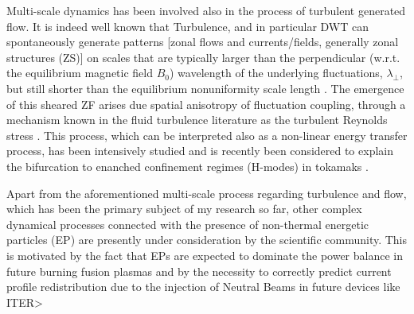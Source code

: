 \documentclass[12pt,a4paper]{article}
\begin{document}
Multi-scale dynamics has been involved also in the process of
turbulent generated flow. It is indeed well known that Turbulence, and
in particular DWT can spontaneously generate patterns [zonal flows and
currents/fields, generally zonal structures (ZS)] 
on scales that are typically larger than the perpendicular (w.r.t. the
equilibrium magnetic field $B_0$) 
wavelength of the underlying fluctuations, $\lambda_{\perp}$, but
still shorter than the equilibrium nonuniformity scale length
\cite{Hasegawa:1979cp}. 
The emergence of this sheared ZF arises due spatial anisotropy of
fluctuation coupling, through a mechanism known in the fluid
turbulence literature as the turbulent Reynolds stress
\cite{Tynan:2009p4426}. This process, which can be interpreted also as a
non-linear energy transfer process, has been intensively studied
\cite{Vianello:2005p1976,Vianello:2006p1149} and is recently been
considered to explain the bifurcation to enanched confinement regimes
(H-modes) in tokamaks \cite{Schmitz:2012hwa}. 

Apart from the aforementioned multi-scale process regarding turbulence
and flow, which has been the primary subject of my research so far,
other complex dynamical processes connected with the presence of non-thermal
energetic particles (EP) are presently under consideration by the
scientific community. This is motivated
by the fact that EPs are expected to dominate the power balance in
future burning fusion plasmas \cite{Zonca:2015hs} and by the necessity
to correctly predict current profile redistribution due to the
injection of Neutral Beams in future devices like ITER> 
\end{document}
